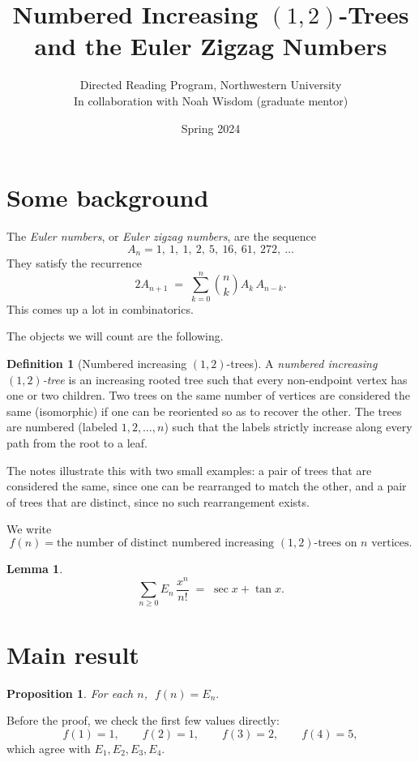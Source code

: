 \documentclass[11pt]{article}
\title{Numbered Increasing $(1,2)$-Trees and the Euler Zigzag Numbers}
\author{Directed Reading Program, Northwestern University\\[2pt]
\small In collaboration with Noah Wisdom (graduate mentor)}
\date{Spring 2024}
\theoremstyle{definition}
\newtheorem{definition}{Definition}
\theoremstyle{plain}
\newtheorem{lemma}{Lemma}
\newtheorem{proposition}{Proposition}
\begin{document}
\maketitle

\section*{Some background}

The \emph{Euler numbers}, or \emph{Euler zigzag numbers}, are the sequence
\[
A_n = 1,\ 1,\ 1,\ 2,\ 5,\ 16,\ 61,\ 272,\ \dots
\]
They satisfy the recurrence
\[
2A_{n+1} \;=\; \sum_{k=0}^{n} \binom{n}{k} A_k\, A_{n-k}.
\]
This comes up a lot in combinatorics.

\bigskip

The objects we will count are the following.

\begin{definition}[Numbered increasing $(1,2)$-trees]
A \emph{numbered increasing $(1,2)$-tree} is an increasing rooted tree such that
every non-endpoint vertex has one or two children. Two trees on the same number
of vertices are considered the same (isomorphic) if one can be reoriented so as
to recover the other. The trees are numbered (labeled $1, 2, \dots, n$) such that
the labels strictly increase along every path from the root to a leaf.
\end{definition}

The notes illustrate this with two small examples: a pair of trees that are
considered the same, since one can be rearranged to match the other, and a pair
of trees that are distinct, since no such rearrangement exists.

\bigskip

We write
\[
f(n) = \text{the number of distinct numbered increasing $(1,2)$-trees on $n$ vertices.}
\]

\begin{lemma}\label{lem:egf}
\[
\sum_{n \ge 0} E_n\, \frac{x^n}{n!} \;=\; \sec x + \tan x .
\]
\end{lemma}

\section*{Main result}

\begin{proposition}
For each $n$, $\; f(n) = E_n.$
\end{proposition}

Before the proof, we check the first few values directly:
\[
f(1) = 1, \qquad f(2) = 1, \qquad f(3) = 2, \qquad f(4) = 5,
\]
which agree with $E_1, E_2, E_3, E_4$.
\end{document}
